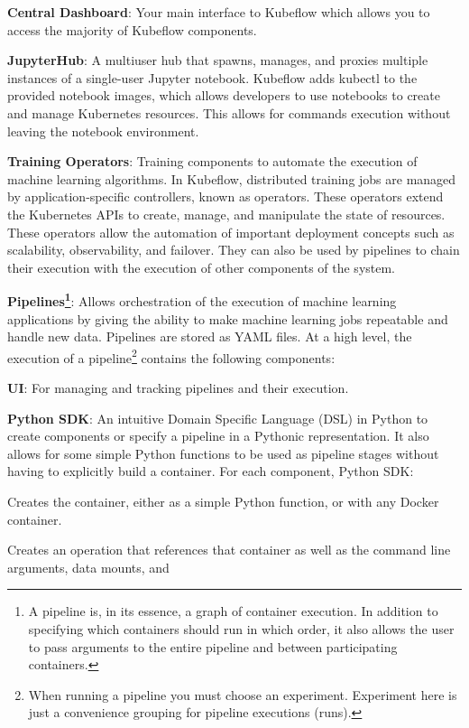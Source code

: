 \bit \item \textbf{Central Dashboard}: Your main interface to Kubeflow which allows you to access the majority of
Kubeflow components.
\item \textbf{JupyterHub}: A multiuser hub that spawns, manages, and proxies multiple instances of a single-user
Jupyter notebook. Kubeflow adds kubectl to the provided notebook images, which allows developers to use notebooks to
create and manage Kubernetes resources. This allows for commands execution without leaving the notebook environment.
\item \textbf{Training Operators}: Training components to automate the execution of machine learning algorithms. In
Kubeflow, distributed training jobs are managed by application-specific controllers, known as operators. These
operators extend the Kubernetes APIs to create, manage, and manipulate the state of resources. These operators allow
the automation of important deployment concepts such as scalability, observability, and failover. They can also be
used by pipelines to chain their execution with the execution of other components of the system.
\item \textbf{Pipelines\footnote{A pipeline is, in its essence, a graph of container execution. In addition to
specifying which containers should run in which order, it also allows the user to pass arguments to the entire
pipeline and between participating containers.}}: Allows orchestration of the execution of machine learning
applications by giving the ability to make machine learning jobs repeatable and handle new data. Pipelines are stored
as YAML files. At a high level, the execution of a pipeline\footnote{When running a pipeline you must choose an
experiment. Experiment here is just a convenience grouping for pipeline executions (runs).} contains the following
components:
\bit
\item \textbf{UI}: For managing and tracking pipelines and their execution.
\item \textbf{Python SDK}: An intuitive Domain Specific Language (DSL) in Python to create components or specify a
pipeline in a Pythonic representation. It also allows for some simple Python functions to be used as pipeline stages
without having to explicitly build a container. For each component, Python SDK:
\bit
\item Creates the container, either as a simple Python function, or with any Docker container.
\item Creates an operation that references that container as well as the command line arguments, data mounts, and
